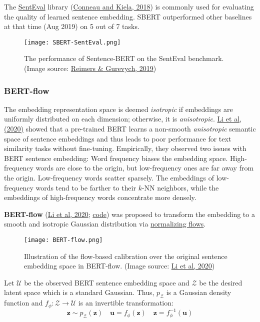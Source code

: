 \documentclass[12pt]{article}
\begin{document}
The \href{https://github.com/facebookresearch/SentEval}{SentEval} library (\href{https://arxiv.org/abs/1803.05449}{Conneau and Kiela, 2018}) is commonly used for evaluating the quality of learned sentence embedding. SBERT outperformed other baselines at that time (Aug 2019) on 5 out of 7 tasks.

\begin{figure}[H]
    \centering
    \texttt{[image: SBERT-SentEval.png]}
    \caption{The performance of Sentence-BERT on the SentEval benchmark. (Image source: \href{https://arxiv.org/abs/1908.10084}{Reimers \& Gurevych, 2019})}
\end{figure}

\subsubsection{BERT-flow}
The embedding representation space is deemed \emph{isotropic} if embeddings are uniformly distributed on each dimension; otherwise, it is \emph{anisotropic}. \href{https://arxiv.org/abs/2011.05864}{Li et al, (2020)} showed that a pre-trained BERT learns a non-smooth \emph{anisotropic} semantic space of sentence embeddings and thus leads to poor performance for text similarity tasks without fine-tuning. Empirically, they observed two issues with BERT sentence embedding: Word frequency biases the embedding space. High-frequency words are close to the origin, but low-frequency ones are far away from the origin. Low-frequency words scatter sparsely. The embeddings of low-frequency words tend to be farther to their $k$-NN neighbors, while the embeddings of high-frequency words concentrate more densely.

\textbf{BERT-flow} (\href{https://arxiv.org/abs/2011.05864}{Li et al, 2020}; \href{https://github.com/bohanli/BERT-flow}{code}) was proposed to transform the embedding to a smooth and isotropic Gaussian distribution via \href{https://lilianweng.github.io/posts/2018-10-13-flow-models/#what-is-normalizing-flows}{normalizing flows}.

\begin{figure}[H]
    \centering
    \texttt{[image: BERT-flow.png]}
    \caption{Illustration of the flow-based calibration over the original sentence embedding space in BERT-flow. (Image source: \href{https://arxiv.org/abs/2011.05864}{Li et al, 2020})}
\end{figure}

Let $\mathcal{U}$ be the observed BERT sentence embedding space and $\mathcal{Z}$ be the desired latent space which is a standard Gaussian. Thus, $p_\mathcal{Z}$ is a Gaussian density function and $f_\phi: \mathcal{Z}\to\mathcal{U}$ is an invertible transformation:
\[
\mathbf{z}\sim p_\mathcal{Z}(\mathbf{z}) \quad 
\mathbf{u}=f_\phi(\mathbf{z}) \quad
\mathbf{z}=f^{-1}_\phi(\mathbf{u}) 
\]
\end{document}
